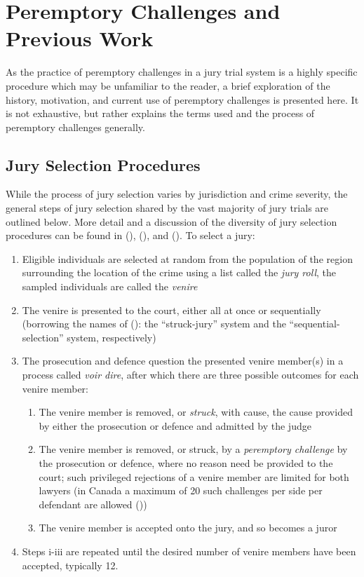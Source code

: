 \section{Peremptory Challenges and Previous Work} \label{c:background}

As the practice of peremptory challenges in a jury trial system is a highly specific procedure which may be unfamiliar to the
reader, a brief exploration of the history, motivation, and current use of peremptory challenges is presented here. It is not
exhaustive, but rather explains the terms used and the process of peremptory challenges generally.

\subsection{Jury Selection Procedures} \label{sec:jurysel}

While the process of jury selection varies by jurisdiction and crime severity, the general steps of jury selection shared by the
vast majority of jury trials are outlined below. More detail and a discussion of the diversity of jury selection procedures can be
found in (\cite{ford2010}), (\cite{hansvidjudging}), and (\cite{vandykejurysel}). To select a jury:

\begin{enumerate}
  \item Eligible individuals are selected at random from the population of the region surrounding the location of the crime using
    a list called the \textit{jury roll}, the sampled individuals are called the \textit{venire}
  \item The venire is presented to the court, either all at once or sequentially (borrowing the names of (\cite{ford2010}): the
    ``struck-jury'' system and the ``sequential-selection'' system, respectively)
  \item The prosecution and defence question the presented venire member(s) in a process called \textit{voir dire}, after which there are three possible
    outcomes for each venire member:
    \begin{enumerate}
      \item The venire member is removed, or \textit{struck}, with cause, the cause provided by either the prosecution or defence and admitted by
        the judge
      \item The venire member is removed, or struck, by a \textit{peremptory challenge} by the prosecution or defence, where no reason
        need be provided to the court; such privileged rejections of a venire member are limited for both lawyers (in
        Canada a maximum of 20 such challenges per side per defendant are allowed (\cite{perempchallaw}))
      \item The venire member is accepted onto the jury, and so becomes a juror
    \end{enumerate}
  \item Steps i-iii are repeated until the desired number of venire members have been accepted, typically 12.
\end{enumerate}

